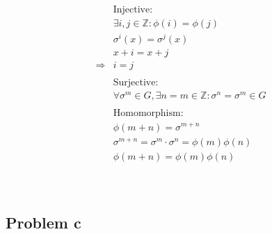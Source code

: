 \documentclass{article}
\begin{document}
\begin{equation*}
    \begin{split}
        &\text{Injective}:\\
        &\exists i,j\in\mathbb{Z} :\phi(i)=\phi(j)\\
        &\sigma^i(x)=\sigma^j(x)\\
        &x+i=x+j\\
        \Rightarrow&i=j\\
        &\\
        &\text{Surjective}:\\
        &\forall \sigma^m\in G,\exists n=m\in\mathbb{Z} :\sigma^n=\sigma^m\in G\\
        &\\
        &\text{Homomorphism}:\\
        &\phi(m+n)=\sigma^{m+n}\\
        &\sigma^{m+n}=\sigma^m\cdot\sigma^n=\phi(m)\phi(n)\\
        &\phi(m+n)=\phi(m)\phi(n)\\
    \end{split}
\end{equation*}

~

\subsection*{Problem c}

~
\end{document}
